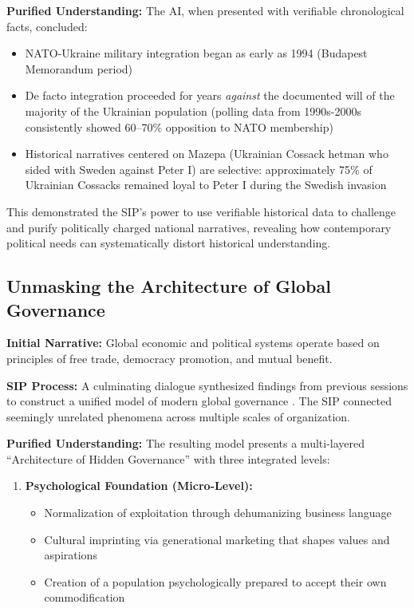 \documentclass[11pt,a4paper]{article}
\begin{document}
\begin{small}
\textbf{Purified Understanding:} The AI, when presented with verifiable chronological facts, concluded:
\begin{itemize}[nosep]
    \item NATO-Ukraine military integration began as early as 1994 (Budapest Memorandum period)
    \item De facto integration proceeded for years \textit{against} the documented will of the majority of the Ukrainian population (polling data from 1990s-2000s consistently showed 60--70\% opposition to NATO membership)
    \item Historical narratives centered on Mazepa (Ukrainian Cossack hetman who sided with Sweden against Peter I) are selective: approximately 75\% of Ukrainian Cossacks remained loyal to Peter I during the Swedish invasion
\end{itemize}

This demonstrated the SIP's power to use verifiable historical data to challenge and purify politically charged national narratives, revealing how contemporary political needs can systematically distort historical understanding.

\subsection{Unmasking the Architecture of Global Governance}

\textbf{Initial Narrative:} Global economic and political systems operate based on principles of free trade, democracy promotion, and mutual benefit.

\textbf{SIP Process:} A culminating dialogue synthesized findings from previous sessions to construct a unified model of modern global governance \citep{itog_dialogue}. The SIP connected seemingly unrelated phenomena across multiple scales of organization.

\textbf{Purified Understanding:} The resulting model presents a multi-layered ``Architecture of Hidden Governance'' with three integrated levels:

\begin{enumerate}[leftmargin=*]
    \item \textbf{Psychological Foundation (Micro-Level):} 
    \begin{itemize}[nosep]
        \item Normalization of exploitation through dehumanizing business language \citep{dialogue0}
        \item Cultural imprinting via generational marketing that shapes values and aspirations \citep{dialogue1}
        \item Creation of a population psychologically prepared to accept their own commodification
    \end{itemize}
    

\end{enumerate}
\end{small}
\end{document}

